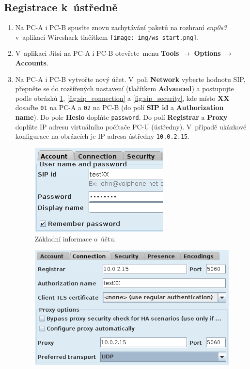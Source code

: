 \subsection{Registrace k~ústředně}
\begin{enumerate}
    \item Na PC-A i PC-B spusťte znovu zachytávání paketů na rozhraní \emph{enp0s3} v aplikaci Wireshark tlačítkem \texttt{[image: img/ws\_start.png]}.
    \item V~aplikaci Jitsi na PC-A i PC-B otevřete menu {\bf Tools} $\rightarrow$ {\bf Options} $\rightarrow$ {\bf Accounts}.
    \item Na PC-A i PC-B vytvořte nový účet. V~poli {\bf Network} vyberte hodnotu SIP, přepněte se do rozšířených nastavení (tlačítkem {\bf Advanced}) a postupujte podle obrázků \ref{fig:sip_account}, \ref{fig:sip_connection} a \ref{fig:sip_security}, kde místo {\bf XX} dosaďte \texttt{01} na PC-A a \texttt{02} na PC-B (do polí \textbf{SIP id} a \textbf{Authorization name}).
	Do pole \textbf{Heslo} doplňte \texttt{password}. Do polí \textbf{Registrar} a \textbf{Proxy} doplňte IP adresu virtuálního počítače PC-U (ústředny). V~případě ukázkové konfigurace na obrázcích je IP adresa ústředny \texttt{10.0.2.15}.\\
\begin{figure}[H]
  \centering
  \includegraphics[scale=1]{img/sip_account.png}
  \caption{Základní informace o~účtu.}
  \label{fig:sip_account}
\end{figure}
\begin{figure}[H]
  \centering
  \includegraphics[scale=1]{img/sip_connection.png}

\end{figure}
\end{enumerate}
